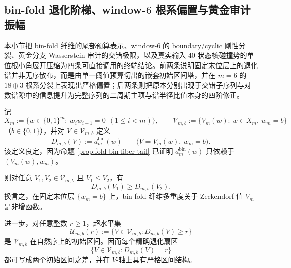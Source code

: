 \subsection{bin-fold 退化阶梯、window-\texorpdfstring{$6$}{6} 根系偏置与黄金审计振幅}\label{subsec:conclusion-foldbin-staircase-window6-golden-twist-rigidity}
本小节把 bin-fold 纤维的尾部预算表示、window-\(6\) 的 boundary/cyclic 刚性分裂、黄金分支 Wasserstein 审计的交错极限，以及真实输入 \(40\) 状态核碰撞势的单位根小角展开压缩为四条可直接调用的终端结论。前两条说明固定末位层上的退化谱并非无序散布，而是由单一阈值预算切出的嵌套初始区间塔，并在 \(m=6\) 的 \(18\oplus 3\) 根系分裂上表现出严格偏置；后两条则把原本分别出现于交错子序列与对数谱隙中的信息提升为完整序列的二周期主项与谱半径比值本身的四阶修正。

\begin{theorem}\label{thm:conclusion-foldbin-lastbit-monotone-superlevel-interval}
记
\[
X_m:=\{w\in\{0,1\}^m:\ w_iw_{i+1}=0\ \ (1\le i<m)\},
\qquad
\mathcal V_{m,b}:=\{V_m(w):\ w\in X_m,\ w_m=b\}
\]
（\(b\in\{0,1\}\)），并对 \(V\in\mathcal V_{m,b}\) 定义
\[
D_{m,b}(V):=d_m^{\mathrm{bin}}(w)
\qquad
\bigl(V=V_m(w),\ w_m=b\bigr).
\]
该定义良定，因为命题 \ref{prop:fold-bin-fiber-tail} 已证明 \(d_m^{\mathrm{bin}}(w)\) 只依赖于 \((V_m(w),w_m)\)。

则对任意 \(V_1,V_2\in\mathcal V_{m,b}\) 且 \(V_1\le V_2\)，有
\[
\boxed{\;
D_{m,b}(V_1)\ge D_{m,b}(V_2).\;}
\]
换言之，在固定末位层 \(\{w_m=b\}\) 上，bin-fold 纤维多重度关于 Zeckendorf 值 \(V_m\) 是非增函数。

进一步，对任意整数 \(r\ge 1\)，超水平集
\[
\mathcal U_{m,b}(r):=\{V\in\mathcal V_{m,b}:D_{m,b}(V)\ge r\}
\]
是 \(\mathcal V_{m,b}\) 在自然序上的初始区间。因而每个精确退化扇区
\[
\{V\in\mathcal V_{m,b}:D_{m,b}(V)=r\}
\]
都可写成两个初始区间之差，并在 \(V\)-轴上具有严格区间结构。
\end{theorem}
